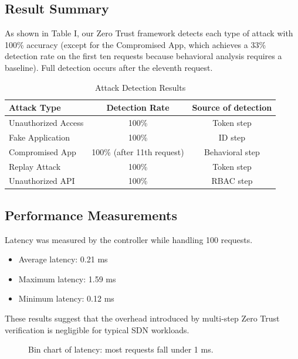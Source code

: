 \documentclass[conference]{IEEEtran}
\begin{document}
\subsection{Result Summary}

As shown in Table I, our Zero Trust framework detects each type of attack with 100\% accuracy (except for the Compromised App, which achieves a 33\% detection rate on the first ten requests because behavioral analysis requires a baseline). Full detection occurs after the eleventh request.

\begin{table}[h]
\centering
\caption{Attack Detection Results}
\label{tbl:detection}
\begin{tabular}{@{}lcc@{}}
\toprule
Attack Type & Detection Rate & Source of detection \\ \midrule
Unauthorized Access & 100\% & Token step \\
Fake Application & 100\% & ID step \\
Compromised App & 100\% (after 11th request) & Behavioral step \\
Replay Attack & 100\% & Token step \\
Unauthorized API & 100\% & RBAC step \\ \bottomrule
\end{tabular}
\end{table}

\subsection{Performance Measurements}

Latency was measured by the controller while handling 100 requests.

\begin{itemize}
\item Average latency: 0.21 ms
\item Maximum latency: 1.59 ms
\item Minimum latency: 0.12 ms
\end{itemize}

These results suggest that the overhead introduced by multi-step Zero Trust verification is negligible for typical SDN workloads.

\begin{figure}[h]
\centering
\fbox{\textcolor{lightgray}{\rule{0.8\textwidth}{4cm}}}
\caption{Bin chart of latency: most requests fall under 1 ms.}
\label{fig:latency}
\end{figure}
\end{document}
